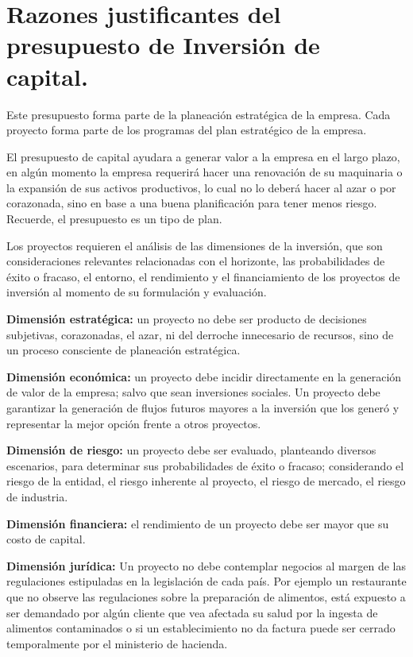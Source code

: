 \documentclass[12pt, a4paper]{article}
\begin{document}
\section{Razones justificantes del presupuesto de Inversión de capital.}

Este presupuesto forma parte de la planeación estratégica de la empresa. Cada proyecto forma parte de los programas del plan estratégico de la empresa.

El presupuesto de capital ayudara a generar valor a la empresa en el largo plazo, en algún momento la empresa requerirá hacer una renovación de su maquinaria o la expansión de sus activos productivos, lo cual no lo deberá hacer al azar o por corazonada, sino en base a una buena planificación para tener menos riesgo. Recuerde, el presupuesto es un tipo de plan.

Los proyectos requieren el análisis de las dimensiones de la inversión, que son consideraciones relevantes relacionadas con el horizonte, las probabilidades de éxito o fracaso, el entorno, el rendimiento y el financiamiento de los proyectos de inversión al momento de su formulación y evaluación.

\textbf{Dimensión estratégica:} un proyecto no debe ser producto de decisiones subjetivas, corazonadas, el azar, ni del derroche innecesario de recursos, sino de un proceso consciente de planeación estratégica.

\textbf{Dimensión económica:} un proyecto debe incidir directamente en la generación de valor de la empresa; salvo que sean inversiones sociales. Un proyecto debe garantizar la generación de flujos futuros mayores a la inversión que los generó y representar la mejor opción frente a otros proyectos.

\textbf{Dimensión de riesgo:} un proyecto debe ser evaluado, planteando diversos escenarios, para determinar sus probabilidades de éxito o fracaso; considerando el riesgo de la entidad, el riesgo inherente al proyecto, el riesgo de mercado, el riesgo de industria.

\textbf{Dimensión financiera:} el rendimiento de un proyecto debe ser mayor que su costo de capital.

\textbf{Dimensión jurídica:} Un proyecto no debe contemplar negocios al margen de las regulaciones estipuladas en la legislación de cada país. Por ejemplo un restaurante que no observe las regulaciones sobre la preparación de alimentos, está expuesto a ser demandado por algún cliente que vea afectada su salud por la ingesta de alimentos contaminados o si un establecimiento no da factura puede ser cerrado temporalmente por el ministerio de hacienda.
\end{document}
